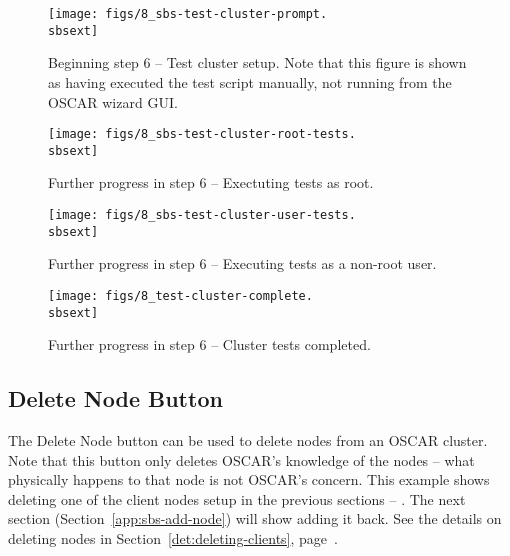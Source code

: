 \begin{figure}[h]
  \begin{center}
    \centerline{\texttt{[image: figs/8\_sbs-test-cluster-prompt.\\sbsext]}}
    \caption[Beginning step 6 -- Test cluster setup.]{Beginning step
      6 -- Test cluster setup.  Note that this figure is shown as
      having executed the test script manually, not running from the
      OSCAR wizard GUI.} 
    \label{fig:sbs-install-wizard-s6}
  \end{center}
\end{figure}

\begin{figure}[htbp]
  \begin{center}
    \centerline{\texttt{[image: figs/8\_sbs-test-cluster-root-tests.\\sbsext]}}
    \caption{Further progress in step 6 -- Exectuting tests as root.}
    \label{fig:sbs-setup-test}
  \end{center}
\end{figure}

\begin{figure}[htbp]
  \begin{center}
    \centerline{\texttt{[image: figs/8\_sbs-test-cluster-user-tests.\\sbsext]}}
    \caption{Further progress in step 6 -- Executing tests as a non-root user.}
    \label{fig:sbs-setup-test1}
  \end{center}
\end{figure}

\begin{figure}[htbp]
  \begin{center}
    \centerline{\texttt{[image: figs/8\_test-cluster-complete.\\sbsext]}}
    \caption{Further progress in step 6 -- Cluster tests completed.}
    \label{fig:sbs-setup-test2}
  \end{center}
\end{figure}

\clearpage



\subsection{Delete Node Button}
\label{app:sbs-delete-node}

The Delete Node button can be used to delete nodes from an OSCAR
cluster.  Note that this button only deletes OSCAR's knowledge of the
nodes -- what physically happens to that node is not OSCAR's concern.
This example shows deleting one of the client nodes setup in the
previous sections -- .  The next section
(Section~\ref{app:sbs-add-node}) will show adding it back.  See the
details on deleting nodes in Section~\ref{det:deleting-clients},
page~\pageref{det:deleting-clients}.

